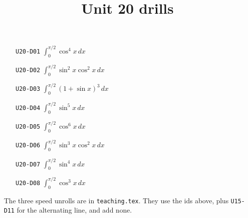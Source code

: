 \title{Unit 20 drills}\maketitle\begin{enumerate}
  \item[\texttt{U20-D01}] $\displaystyle \int_{0}^{\pi/2}\cos^{4}x\,dx$
  \item[\texttt{U20-D02}] $\displaystyle \int_{0}^{\pi/2}\sin^{2}x\cos^{2}x\,dx$
  \item[\texttt{U20-D03}] $\displaystyle \int_{0}^{\pi/2}(1+\sin x)^{3}\,dx$
  \item[\texttt{U20-D04}] $\displaystyle \int_{0}^{\pi/2}\sin^{5}x\,dx$
  \item[\texttt{U20-D05}] $\displaystyle \int_{0}^{\pi/2}\cos^{6}x\,dx$
  \item[\texttt{U20-D06}] $\displaystyle \int_{0}^{\pi/2}\sin^{3}x\cos^{2}x\,dx$
  \item[\texttt{U20-D07}] $\displaystyle \int_{0}^{\pi/2}\sin^{4}x\,dx$
  \item[\texttt{U20-D08}] $\displaystyle \int_{0}^{\pi/2}\cos^{3}x\,dx$
\end{enumerate}
\noindent The three speed unrolls are in \texttt{teaching.tex}. They use the ids above, plus \texttt{U15-D11} for the alternating line, and add none.

